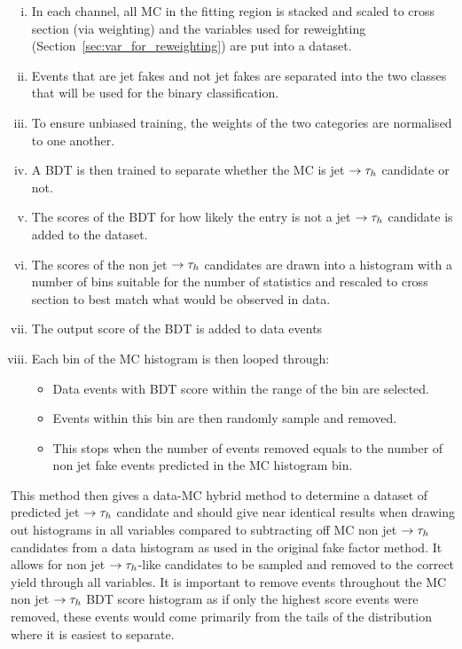 \begin{enumerate}[i)]
  \item In each channel, all MC in the fitting region is stacked and scaled to cross section (via weighting) and the variables used for reweighting (Section~\ref{sec:var_for_reweighting}) are put into a dataset.
  \item Events that are jet fakes and not jet fakes are separated into the two classes that will be used for the binary classification.
  \item To ensure unbiased training, the weights of the two categories are normalised to one another.
  \item A BDT is then trained to separate whether the MC is jet $\rightarrow\tau_{h}$ candidate or not.
  \item The scores of the BDT for how likely the entry is not a jet $\rightarrow\tau_{h}$ candidate is added to the dataset.
  \item The scores of the non jet $\rightarrow\tau_{h}$ candidates are drawn into a histogram with a number of bins suitable for the number of statistics and rescaled to cross section to best match what would be observed in data.
  \item The output score of the BDT is added to data events
  \item Each bin of the MC histogram is then looped through:
  \begin{itemize}
    \item Data events with BDT score within the range of the bin are selected.
    \item Events within this bin are then randomly sample and removed.
    \item This stops when the number of events removed equals to the number of non jet fake events predicted in the MC histogram bin.
  \end{itemize}
\end{enumerate} 

This method then gives a data-MC hybrid method to determine a dataset of predicted jet $\rightarrow\tau_{h}$ candidate and should give near identical results when drawing out histograms in all variables compared to subtracting off MC non jet $\rightarrow\tau_{h}$ candidates from a data histogram as used in the original fake factor method.
It allows for non jet $\rightarrow\tau_{h}$-like candidates to be sampled and removed to the correct yield through all variables.
It is important to remove events throughout the MC non jet $\rightarrow\tau_{h}$ BDT score histogram as if only the highest score events were removed, these events would come primarily from the tails of the distribution where it is easiest to separate.


